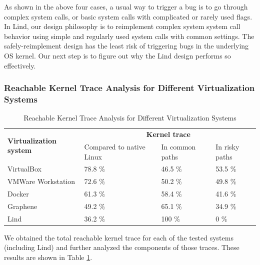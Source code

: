 {{\begin{itemize}
\end{itemize}

As shown in the above four cases, a usual way to trigger a bug is to go through
complex system calls,
or basic system calls with complicated or rarely used flags. In Lind, our
design philosophy is to reimplement complex system system call behavior
using simple and regularly used system calls with common settings.
The safely-reimplement design
has the least risk of triggering bugs in the underlying OS kernel. Our next step
is to figure out why the Lind design performs so effectively.

\subsubsection{Reachable Kernel Trace Analysis for Different Virtualization
Systems}
\label{Reachable-Kernel-Trace-Analysis-for-Different-Virtualization-Systems}

\begin{table}
\centering
\scriptsize
\caption{Reachable Kernel Trace Analysis for Different Virtualization
Systems}
\begin{tabular}{|l|l|l|l|}
  \hline
  \multirow{3}{1.5cm}{\bf Virtualization system} & \multicolumn{3}{c|}{\bf Kernel trace} \\ \cline{2-4}
  & \multirow{2}{1.5cm}{Compared to native Linux} & \multirow{2}{1.5cm}{In common paths} & \multirow{2}{1cm}{In risky paths} \\
  & & & \\  \hline
  VirtualBox & 78.8 \% & 46.5 \% & 53.5 \% \\
  \hline
  \multirow{2}{1.5cm}{VMWare Workstation} & \multirow{2}{*}{72.6 \%} &
  \multirow{2}{*}{50.2 \%} & \multirow{2}{*}{49.8 \%} \\
  & & & \\   \hline
  Docker & 61.3 \% & 58.4 \% & 41.6 \% \\
  \hline
  Graphene & 49.2 \% & 65.1 \% & 34.9 \% \\
  \hline
  Lind & 36.2 \% & 100 \% & 0 \% \\
  \hline
\end{tabular}
\label{table:trace-systems}
\end{table}

We obtained the total reachable kernel trace for
each of the tested systems (including Lind)
and further analyzed the components of those traces. These results
are shown in Table \ref{table:trace-systems}.

}}

